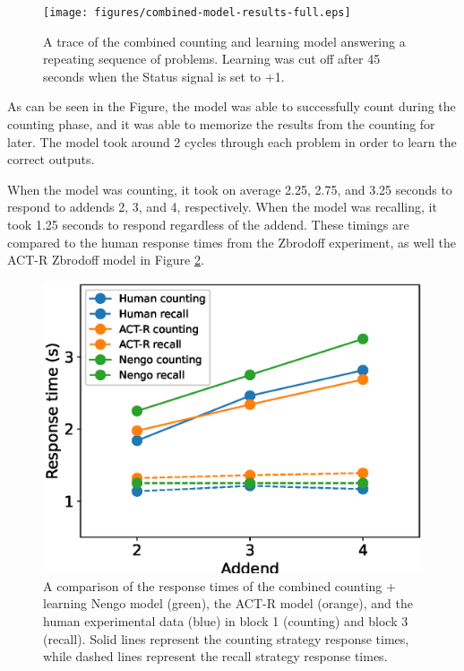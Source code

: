 \documentclass[10pt, a4paper, twocolumn]{article}
\begin{document}
\begin{figure}
	\centering
	\texttt{[image: figures/combined-model-results-full.eps]}
	\caption{A trace of the combined counting and learning model answering a repeating sequence of problems. Learning was cut off after 45 seconds when the Status signal is set to +1.}
	\label{fig:combined-model-results-full}
\end{figure}

As can be seen in the Figure, the model was able to successfully count during the counting phase, and it was able to memorize the results from the counting for later. The model took around 2 cycles through each problem in order to learn the correct outputs.

When the model was counting, it took on average 2.25, 2.75, and 3.25 seconds to respond to addends 2, 3, and 4, respectively. When the model was recalling, it took 1.25 seconds to respond regardless of the addend. These timings are compared to the human response times from the Zbrodoff experiment, as well the ACT-R Zbrodoff model in Figure \ref{fig:timing-comparison}.

\begin{figure}[h]
	\centering
	\includegraphics[width=1.0\linewidth]{figures/timing-comparison.eps}
	\caption{A comparison of the response times of the combined counting + learning Nengo model (green), the ACT-R model (orange), and the human experimental data (blue) in block 1 (counting) and block 3 (recall). Solid lines represent the counting strategy response times, while dashed lines represent the recall strategy response times.}
	\label{fig:timing-comparison}
\end{figure}
\end{document}
